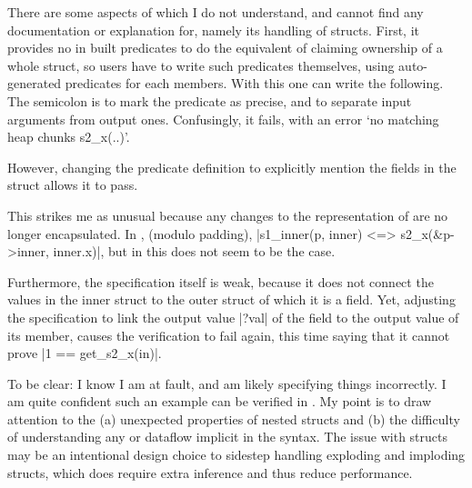 There are some aspects of  which I do not understand, and cannot
find any documentation or explanation for, namely its handling of structs.
First, it provides no in built predicates to do the equivalent of claiming
ownership of a whole struct, so users have to write such predicates themselves,
using auto-generated predicates for each members. With this one can write the
following. The semicolon is to mark the predicate as precise, and to separate
input arguments from output ones. Confusingly, it fails, with an error `no
matching heap chunks s2\_x(..)'. %


However, changing the predicate definition to explicitly mention the fields in
the  struct allows it to pass.

This strikes me as unusual because any changes to the representation of
 are no longer encapsulated. In , (modulo padding),
\cinline[breaklines]|s1_inner(p, inner) <=> s2_x(&p->inner, inner.x)|, %
 but in  this does not seem
to be the case.

Furthermore, the specification itself is weak, because it does not connect the
values in the inner struct to the outer struct of which it is a field. Yet,
adjusting the specification to link the output value \cinline|?val| of the
field to the output value of its member, causes the verification to fail again,
this time saying that it cannot prove \cinline|1 == get_s2_x(in)|. %


To be clear: I know I am at fault, and am likely specifying things incorrectly.
I am quite confident such an example can be verified in . My point
is to draw attention to the (a) unexpected properties of nested structs and (b)
the difficulty of understanding any  or dataflow implicit in the
syntax. The issue with structs may be an intentional design choice to sidestep
handling exploding and imploding structs, which does require extra inference
and thus reduce performance.

